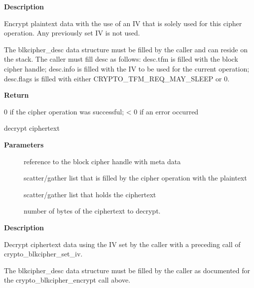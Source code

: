 \documentclass[a4paper,8pt,english]{sphinxmanual}
\begin{document}
\textbf{Description}

Encrypt plaintext data with the use of an IV that is solely used for this
cipher operation. Any previously set IV is not used.

The blkcipher\_desc data structure must be filled by the caller and can
reside on the stack. The caller must fill desc as follows: desc.tfm is filled
with the block cipher handle; desc.info is filled with the IV to be used for
the current operation; desc.flags is filled with either
CRYPTO\_TFM\_REQ\_MAY\_SLEEP or 0.

\textbf{Return}

0 if the cipher operation was successful; \textless{} 0 if an error occurred

\begin{fulllineitems}
\label{crypto/api-skcipher:c.crypto_blkcipher_decrypt}
decrypt ciphertext

\end{fulllineitems}


\textbf{Parameters}
\begin{description}
\item[{}] \leavevmode
reference to the block cipher handle with meta data

\item[{}] \leavevmode
scatter/gather list that is filled by the cipher operation with the
plaintext

\item[{}] \leavevmode
scatter/gather list that holds the ciphertext

\item[{}] \leavevmode
number of bytes of the ciphertext to decrypt.

\end{description}

\textbf{Description}

Decrypt ciphertext data using the IV set by the caller with a preceding
call of crypto\_blkcipher\_set\_iv.

The blkcipher\_desc data structure must be filled by the caller as documented
for the crypto\_blkcipher\_encrypt call above.
\end{document}
